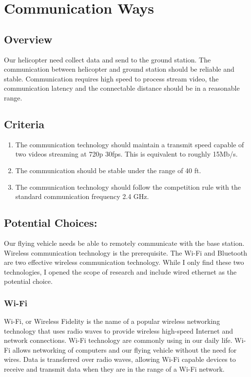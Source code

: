 \documentclass[letterpaper, 10, draftclsnofoot, onecolumn,compsoc]{IEEEtran}
\begin{document}
\section{Communication Ways}
\subsection{Overview}
Our helicopter need collect data and send to the ground station. The communication between helicopter and ground station should be reliable and stable. Communication requires high speed to process stream video, the communication latency and the connectable distance should be in a reasonable range.

\subsection{Criteria}
\begin{enumerate}
\item{The communication technology should maintain a transmit speed capable of two videos streaming at 720p 30fps. This is equivalent to roughly 15Mb/s.}
\item {The communication should be stable under the range of 40 ft.}
\item {The communication technology should follow the competition rule with the standard communication frequency 2.4 GHz.}
\end{enumerate}

\subsection{Potential Choices:}
Our flying vehicle needs be able to remotely communicate with the base station. Wireless communication technology is the prerequisite. The Wi-Fi and Bluetooth are two effective wireless communication technology. While I only find these two technologies, I opened the scope of research and include wired ethernet as the potential choice.
\subsubsection{Wi-Fi}
Wi-Fi, or Wireless Fidelity\cite{r3} is the name of a popular wireless networking technology that uses radio waves to provide wireless high-speed Internet and network connections. Wi-Fi technology are commonly using in our daily life. Wi-Fi allows networking of computers and our flying vehicle without the need for wires. Data is transferred over radio waves, allowing Wi-Fi capable devices to receive and transmit data when they are in the range of a Wi-Fi network. 
\end{document}
